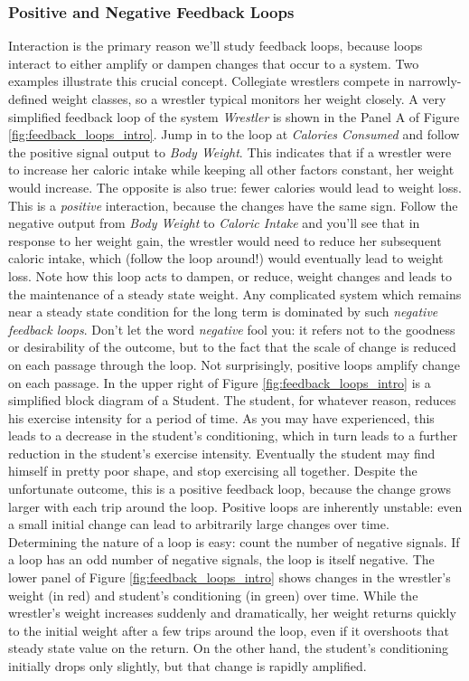 \documentclass[amstex,12pt]{book}
\begin{document}
\subsubsection{Positive and Negative Feedback Loops}
Interaction is the primary reason we'll study feedback loops, because loops interact to either amplify or dampen changes that occur to a system. Two examples illustrate this crucial concept. Collegiate wrestlers compete in narrowly-defined weight classes, so a wrestler typical monitors her weight closely. A very simplified feedback loop of the system \textit{Wrestler} is shown in the Panel A of Figure \ref{fig:feedback_loops_intro}. Jump in to the loop at \textit{Calories Consumed} and follow the positive signal output to \textit{Body Weight}. This indicates that if a wrestler were to increase her caloric intake while keeping all other factors constant, her weight would increase. The opposite is also true: fewer calories would lead to weight loss. This is a \emph{positive} interaction, because the changes have the same sign. Follow the negative output from \textit{Body Weight} to \textit{Caloric Intake} and you'll see that in response to her weight gain, the wrestler would need to reduce her subsequent caloric intake, which (follow the loop around!) would eventually lead to weight loss. Note how this loop acts to dampen, or reduce, weight changes and leads to the maintenance of a steady state weight. Any complicated system which remains near a steady state condition for the long term is dominated by such \emph{negative feedback loops}. Don't let the word \textit{negative} fool you: it refers not to the goodness or desirability of the outcome, but to the fact that the scale of change is reduced on each passage through the loop.
Not surprisingly, positive loops amplify change on each passage. In the upper right of Figure \ref{fig:feedback_loops_intro} is a simplified block diagram of a Student. The student, for whatever reason, reduces his exercise intensity for a period of time. As you may have experienced, this leads to a decrease in the student's conditioning, which in turn leads to a further reduction in the student's exercise intensity. Eventually the student may find himself in pretty poor shape, and stop exercising all together. Despite the unfortunate outcome, this is a positive feedback loop, because the change grows larger with each trip around the loop. Positive loops are inherently unstable: even a small initial change can lead to arbitrarily large changes over time.\\
Determining the nature of a loop is easy: count the number of negative signals. If a loop has an odd number of negative signals, the loop is itself negative. The lower panel of Figure \ref{fig:feedback_loops_intro} shows changes in the wrestler's weight (in red) and student’s conditioning (in green) over time. While the wrestler's weight increases suddenly and dramatically, her weight returns quickly to the initial weight after a few trips around the loop, even if it overshoots that steady state value on the return. On the other hand, the student's conditioning initially drops only slightly, but that change is rapidly amplified.\\
\end{document}
